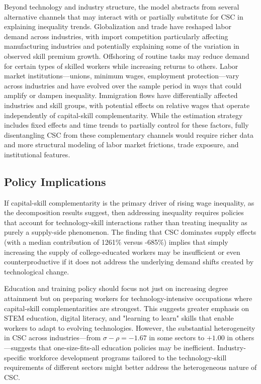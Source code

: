 \documentclass[12pt]{article}
\begin{document}
Beyond technology and industry structure, the model abstracts from several alternative channels that may interact with or partially substitute for CSC in explaining inequality trends. Globalization and trade have reshaped labor demand across industries, with import competition particularly affecting manufacturing industries and potentially explaining some of the variation in observed skill premium growth. Offshoring of routine tasks may reduce demand for certain types of skilled workers while increasing returns to others. Labor market institutions---unions, minimum wages, employment protection---vary across industries and have evolved over the sample period in ways that could amplify or dampen inequality. Immigration flows have differentially affected industries and skill groups, with potential effects on relative wages that operate independently of capital-skill complementarity. While the estimation strategy includes fixed effects and time trends to partially control for these factors, fully disentangling CSC from these complementary channels would require richer data and more structural modeling of labor market frictions, trade exposure, and institutional features.

\subsection{Policy Implications}\label{sec:policy}

If capital-skill complementarity is the primary driver of rising wage inequality, as the decomposition results suggest, then addressing inequality requires policies that account for technology-skill interactions rather than treating inequality as purely a supply-side phenomenon. The finding that CSC dominates supply effects (with a median contribution of 1261\% versus -685\%) implies that simply increasing the supply of college-educated workers may be insufficient or even counterproductive if it does not address the underlying demand shifts created by technological change.

Education and training policy should focus not just on increasing degree attainment but on preparing workers for technology-intensive occupations where capital-skill complementarities are strongest. This suggests greater emphasis on STEM education, digital literacy, and "learning to learn" skills that enable workers to adapt to evolving technologies. However, the substantial heterogeneity in CSC across industries---from $\sigma - \rho = -1.67$ in some sectors to $+1.00$ in others---suggests that one-size-fits-all education policies may be inefficient. Industry-specific workforce development programs tailored to the technology-skill requirements of different sectors might better address the heterogeneous nature of CSC.
\end{document}

